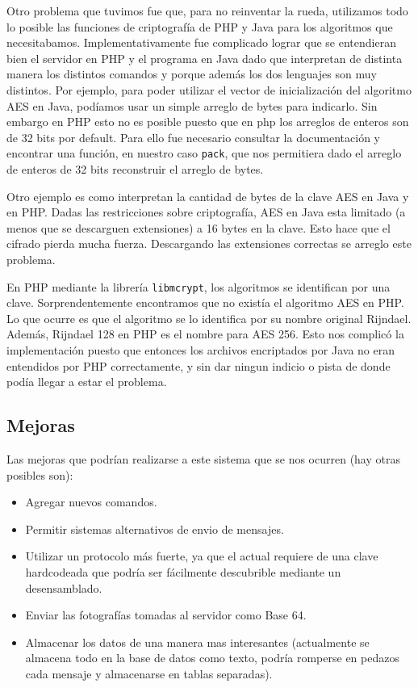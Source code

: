 Otro problema que tuvimos fue que, para no reinventar la rueda, utilizamos
todo lo posible las funciones de criptografía de PHP y Java para los
algoritmos que necesitabamos. Implementativamente fue complicado lograr
que se entendieran bien el servidor en PHP y el programa en Java dado que
interpretan de distinta manera los distintos comandos y porque además los
dos lenguajes son muy distintos. Por ejemplo, para poder utilizar el vector
de inicialización del algoritmo AES en Java, podíamos usar un simple
arreglo de bytes para indicarlo. Sin embargo en PHP esto no es posible
puesto que en php los arreglos de enteros son de 32 bits por default. Para
ello fue necesario consultar la documentaci\'on y encontrar una función,
en nuestro caso \texttt{pack}, que nos permitiera dado el arreglo de enteros
de 32 bits reconstruir el arreglo de bytes.

Otro ejemplo es como interpretan la cantidad de bytes de la clave AES en
Java y en PHP. Dadas las restricciones sobre criptografía, AES en Java
esta limitado (a menos que se descarguen extensiones) a 16 bytes en la clave.
Esto hace que el cifrado pierda mucha fuerza. Descargando las extensiones
correctas se arreglo este problema.

En PHP mediante la librería \texttt{libmcrypt}, los algoritmos se identifican
por una clave. Sorprendentemente encontramos que no existía el algoritmo AES
en PHP. Lo que ocurre es que el algoritmo se lo identifica por su nombre original
Rijndael. Además, Rijndael 128 en PHP es el nombre para AES 256. Esto nos
complicó la implementación puesto que entonces los archivos encriptados por
Java no eran entendidos por PHP correctamente, y sin dar ningun indicio o pista
de donde podía llegar a estar el problema.

\subsection{Mejoras}

Las mejoras que podrían realizarse a este sistema que se nos ocurren (hay otras
posibles son):

\begin{itemize}
	\item Agregar nuevos comandos.
	\item Permitir sistemas alternativos de envio de mensajes.
	\item Utilizar un protocolo más fuerte, ya que el actual requiere de una
	clave hardcodeada que podría ser fácilmente descubrible mediante un
	desensamblado.
	\item Enviar las fotografías tomadas al servidor como Base 64.
	\item Almacenar los datos de una manera mas interesantes (actualmente se
	almacena todo en la base de datos como texto, podría romperse en pedazos
	cada mensaje y almacenarse en tablas separadas).
\end{itemize}

